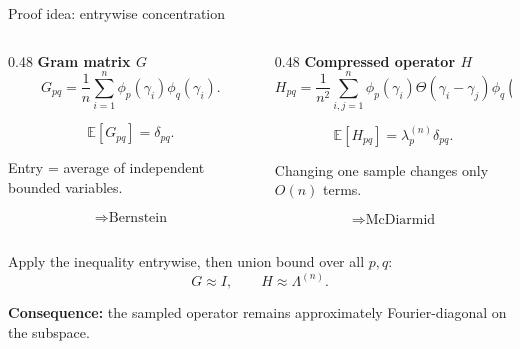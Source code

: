 \documentclass[10pt,aspectratio=169]{beamer}
\newcommand{\E}{\mathbb{E}}
\begin{document}
\begin{frame}{Proof idea: entrywise concentration}

	\begin{columns}[T,onlytextwidth]

		\begin{column}{0.48\textwidth}
			\textbf{Gram matrix \(G\)}
			\[
				G_{pq}
				=
				\frac1n\sum_{i=1}^{n}
				\phi_p(\gamma_i)\phi_q(\gamma_i).
			\]

			\[
				\E[G_{pq}]=\delta_{pq}.
			\]

			\medskip
			Entry = average of independent bounded variables.

			\[
				\Rightarrow \text{Bernstein}
			\]
		\end{column}

		\begin{column}{0.48\textwidth}
			\textbf{Compressed operator \(H\)}
			\[
				H_{pq}
				=
				\frac{1}{n^2}
				\sum_{i,j=1}^{n}
				\phi_p(\gamma_i)
				\Theta(\gamma_i-\gamma_j)
				\phi_q(\gamma_j).
			\]

			\[
				\E[H_{pq}]
				=
				\lambda_p^{(n)}\delta_{pq}.
			\]

			\medskip
			Changing one sample changes only \(O(n)\) terms.

			\[
				\Rightarrow \text{McDiarmid}
			\]
		\end{column}

	\end{columns}

	\pause
	\vspace{0.25cm}

	Apply the inequality entrywise, then union bound over all \(p,q\):
	\[
		G\approx I,
		\qquad
		H\approx \Lambda^{(n)}.
	\]

	\medskip

	\textbf{Consequence:} the sampled operator remains approximately Fourier-diagonal on the subspace.

\end{frame}
\end{document}
